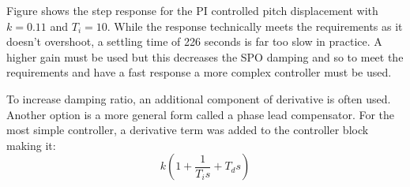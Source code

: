 \documentclass{article}
\begin{document}
Figure shows the step response for the PI controlled pitch displacement with $k=0.11$ and $T_i = 10$.
While the response technically meets the requirements as it doesn't overshoot, a settling time of 226 seconds is far too slow in practice.
A higher gain must be used but this decreases the SPO damping and so to meet the requirements and have a fast response a more complex controller must be used.

To increase damping ratio, an additional component of derivative is often used.
Another option is a more general form called a phase lead compensator.
For the most simple controller, a derivative term was added to the controller block making it:
\begin{equation}
    k\left(1 + \frac{1}{T_i s} + T_d s\right)
\end{equation}
\end{document}
